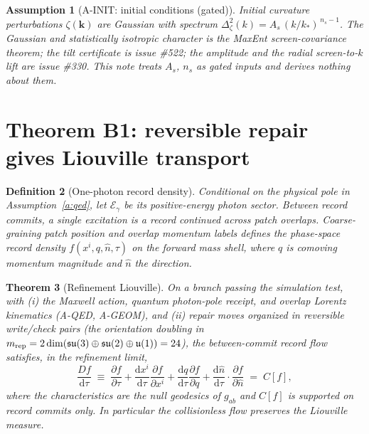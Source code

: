 \documentclass[11pt]{article}
\newtheorem{theorem}{Theorem}[section]
\newtheorem{definition}[theorem]{Definition}
\newtheorem{assumption}[theorem]{Assumption}
\theoremstyle{remark}
\newcommand{\Dd}{\mathrm{d}}
\begin{document}
\begin{assumption}[A-INIT: initial conditions (gated)]\label{a:init}
Initial curvature perturbations $\zeta(\mathbf k)$ are Gaussian with spectrum
$\Delta^2_\zeta(k)=A_s\,(k/k_\ast)^{\,n_s-1}$. The Gaussian and
statistically isotropic character is the MaxEnt screen-covariance theorem;
the tilt certificate is issue \#522; the amplitude and the radial
screen-to-$k$ lift are issue \#330. This note treats $A_s$, $n_s$ as gated
inputs and derives nothing about them.
\end{assumption}

\section{Theorem B1: reversible repair gives Liouville transport}

\begin{definition}[One-photon record density]
Conditional on the physical pole in Assumption~\ref{a:qed}, let
$\mathcal E_\gamma$ be its positive-energy photon sector. Between record
commits, a single excitation is a record continued
across patch overlaps. Coarse-graining patch position and overlap momentum
labels defines the phase-space record density $f(x^i,q,\hat n,\tau)$ on the
forward mass shell, where $q$ is comoving momentum magnitude and $\hat n$ the
direction.
\end{definition}

\begin{theorem}[Refinement Liouville]\label{t:liouville}
On a branch passing the simulation test, with (i) the Maxwell action,
quantum photon-pole receipt, and overlap Lorentz kinematics (A-QED, A-GEOM),
and (ii) repair
moves organized in reversible write/check pairs (the orientation doubling in
$m_{\rm rep}=2\dim(\mathfrak{su}(3)\oplus\mathfrak{su}(2)\oplus\mathfrak
u(1))=24$), the between-commit record flow satisfies, in the refinement
limit,
\[
\frac{Df}{\Dd\tau}\;\equiv\;
\frac{\partial f}{\partial\tau}
+\frac{\Dd x^i}{\Dd\tau}\frac{\partial f}{\partial x^i}
+\frac{\Dd q}{\Dd\tau}\frac{\partial f}{\partial q}
+\frac{\Dd\hat n}{\Dd\tau}\cdot\frac{\partial f}{\partial\hat n}
\;=\;C[f],
\]
where the characteristics are the null geodesics of $g_{ab}$ and $C[f]$ is
supported on record commits only. In particular the collisionless flow
preserves the Liouville measure.
\end{theorem}
\end{document}
